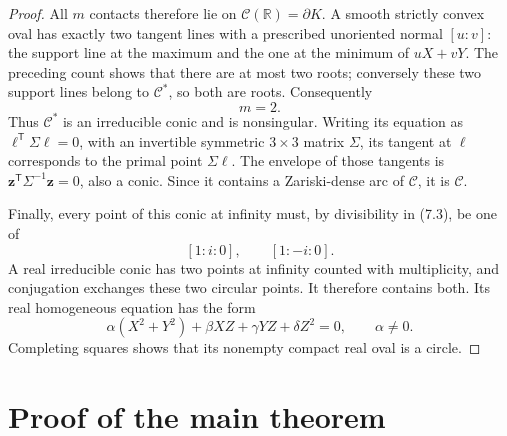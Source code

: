 \documentclass[11pt]{article}
\theoremstyle{definition}
\theoremstyle{remark}
\begin{document}
\begin{proof}
All \(m\) contacts therefore lie on
\(\mathscr C(\mathbb R)=\partial K\).  A smooth strictly convex oval has
exactly two tangent lines with a prescribed unoriented normal \([u:v]\): the
support line at the maximum and the one at the minimum of \(uX+vY\).
The preceding count shows that there are at most two roots; conversely these
two support lines belong to \(\mathscr C^*\), so both are roots.  Consequently
\[
 m=2.                                                 \tag{7.6}
\]
Thus \(\mathscr C^*\) is an irreducible conic and is nonsingular.  Writing its
equation as
\(\boldsymbol\ell^{\mathsf T}\Sigma\boldsymbol\ell=0\), with an invertible
symmetric \(3\times3\) matrix \(\Sigma\), its tangent at
\(\boldsymbol\ell\) corresponds to the primal point
\(\Sigma\boldsymbol\ell\).  The envelope of those tangents is
\(\mathbf z^{\mathsf T}\Sigma^{-1}\mathbf z=0\), also a conic.  Since it
contains a Zariski-dense
arc of \(\mathscr C\), it is \(\mathscr C\).

Finally, every point of this conic at infinity must, by divisibility in
(7.3), be one of
\[
 [1:i:0],\qquad[1:-i:0].
\]
A real irreducible conic has two points at infinity counted with
multiplicity, and conjugation exchanges these two circular points.  It
therefore contains both.  Its real homogeneous equation has the form
\[
 \alpha(X^2+Y^2)+\beta XZ+\gamma YZ+\delta Z^2=0,
 \qquad \alpha\neq0.
\]
Completing squares shows that its nonempty compact real oval is a circle.
\end{proof}

\section{Proof of the main theorem}
\end{document}
